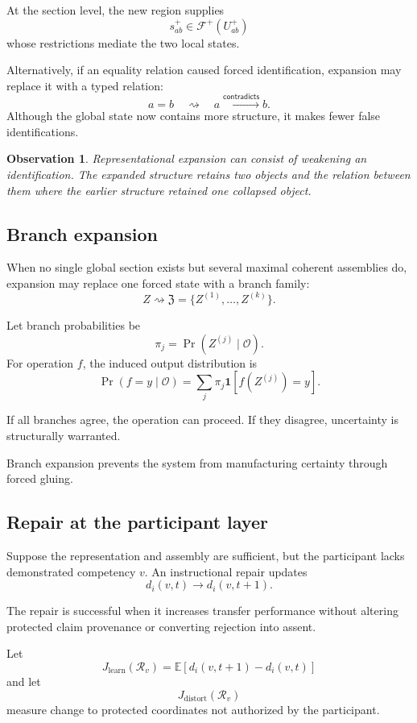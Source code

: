 \documentclass[11pt]{article}
\newtheorem{observation}[definition]{Observation}
\theoremstyle{definition}
\DeclareMathOperator{\Prob}{Pr}
\newcommand{\E}{\mathbb{E}}
\newcommand{\ind}{\mathbf{1}}
\begin{document}
At the section level, the new region supplies
\[
s_{ab}^{+}\in\mathscr F^{+}(U_{ab}^{+})
\]
whose restrictions mediate the two local states.

Alternatively, if an equality relation caused forced identification, expansion may replace it with a typed relation:
\[
a=b
\quad\rightsquigarrow\quad
a\xrightarrow{\mathsf{contradicts}}b.
\]
Although the global state now contains more structure, it makes fewer false identifications.

\begin{observation}
Representational expansion can consist of weakening an identification. The expanded structure retains two objects and the relation between them where the earlier structure retained one collapsed object.
\end{observation}

\subsection{Branch expansion}

When no single global section exists but several maximal coherent assemblies do, expansion may replace one forced state with a branch family:
\[
Z
\rightsquigarrow
\mathfrak Z
=
\{Z^{(1)},\ldots,Z^{(k)}\}.
\]

Let branch probabilities be
\[
\pi_j
=
\Prob(Z^{(j)}\mid\mathcal O).
\]
For operation \(f\), the induced output distribution is
\[
\Prob(f=y\mid\mathcal O)
=
\sum_j
\pi_j
\ind[f(Z^{(j)})=y].
\]

If all branches agree, the operation can proceed. If they disagree, uncertainty is structurally warranted.

Branch expansion prevents the system from manufacturing certainty through forced gluing.

\subsection{Repair at the participant layer}

Suppose the representation and assembly are sufficient, but the participant lacks demonstrated competency \(v\). An instructional repair updates
\[
d_i(v,t)
\to
d_i(v,t+1).
\]

The repair is successful when it increases transfer performance without altering protected claim provenance or converting rejection into assent.

Let
\[
J_{\mathrm{learn}}(\mathcal R_v)
=
\E[d_i(v,t+1)-d_i(v,t)]
\]
and let
\[
J_{\mathrm{distort}}(\mathcal R_v)
\]
measure change to protected coordinates not authorized by the participant.
\end{document}
